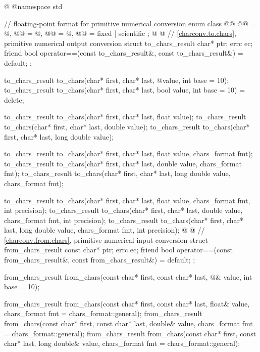 %
\begin{codeblock}
@%
%
%
%
%
%
@namespace std {
  // floating-point format for primitive numerical conversion
  enum class @@ {
    @@ = @\unspec@,
    @@ = @\unspec@,
    @@ = @\unspec@,
    @@ = fixed | scientific
  };
@%
%
%
@
  // \ref{charconv.to.chars}, primitive numerical output conversion
  struct to_chars_result {
    char* ptr;
    errc ec;
    friend bool operator==(const to_chars_result&, const to_chars_result&) = default;
  };

  to_chars_result to_chars(char* first, char* last, @\seebelow@ value, int base = 10);
  to_chars_result to_chars(char* first, char* last, bool value, int base = 10) = delete;

  to_chars_result to_chars(char* first, char* last, float value);
  to_chars_result to_chars(char* first, char* last, double value);
  to_chars_result to_chars(char* first, char* last, long double value);

  to_chars_result to_chars(char* first, char* last, float value, chars_format fmt);
  to_chars_result to_chars(char* first, char* last, double value, chars_format fmt);
  to_chars_result to_chars(char* first, char* last, long double value, chars_format fmt);

  to_chars_result to_chars(char* first, char* last, float value,
                           chars_format fmt, int precision);
  to_chars_result to_chars(char* first, char* last, double value,
                           chars_format fmt, int precision);
  to_chars_result to_chars(char* first, char* last, long double value,
                           chars_format fmt, int precision);
@%
%
%
@
  // \ref{charconv.from.chars}, primitive numerical input conversion
  struct from_chars_result {
    const char* ptr;
    errc ec;
    friend bool operator==(const from_chars_result&, const from_chars_result&) = default;
  };

  from_chars_result from_chars(const char* first, const char* last,
                               @\seebelow@& value, int base = 10);

  from_chars_result from_chars(const char* first, const char* last, float& value,
                               chars_format fmt = chars_format::general);
  from_chars_result from_chars(const char* first, const char* last, double& value,
                               chars_format fmt = chars_format::general);
  from_chars_result from_chars(const char* first, const char* last, long double& value,
                               chars_format fmt = chars_format::general);
}
\end{codeblock}

